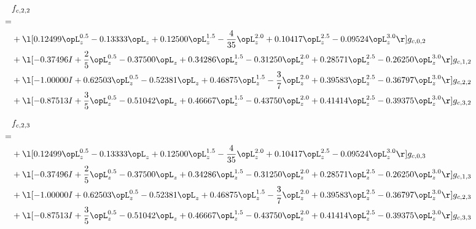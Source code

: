 \begin{alignat}{2} 
\label{eq:f_22_0} 
& f_{c,2,2} \nonumber \\ 
 = \\ 
& + \l[  0.12499 \opL_z^{0.5}   -0.13333 \opL_z +  0.12500 \opL_z^{1.5} - \frac{4}{35} \opL_z^{2.0} +  0.10417 \opL_z^{2.5}   -0.09524 \opL_z^{3.0}  \r] g_{c,0,2} \nonumber \\ 
& + \l[  -0.37496 I + \frac{2}{5} \opL_z^{0.5}   -0.37500 \opL_z +  0.34286 \opL_z^{1.5}   -0.31250 \opL_z^{2.0} +  0.28571 \opL_z^{2.5}   -0.26250 \opL_z^{3.0}  \r] g_{c,1,2} \nonumber \\ 
& + \l[  -1.00000 I +  0.62503 \opL_z^{0.5}   -0.52381 \opL_z +  0.46875 \opL_z^{1.5} - \frac{3}{7} \opL_z^{2.0} +  0.39583 \opL_z^{2.5}   -0.36797 \opL_z^{3.0}  \r] g_{c,2,2} \nonumber \\ 
& + \l[  -0.87513 I + \frac{3}{5} \opL_z^{0.5}   -0.51042 \opL_z +  0.46667 \opL_z^{1.5}   -0.43750 \opL_z^{2.0} +  0.41414 \opL_z^{2.5}   -0.39375 \opL_z^{3.0}  \r] g_{c,3,2} \nonumber \\ 
\end{alignat} 


\begin{alignat}{2} 
\label{eq:f_23_0} 
& f_{c,2,3} \nonumber \\ 
 = \\ 
& + \l[  0.12499 \opL_z^{0.5}   -0.13333 \opL_z +  0.12500 \opL_z^{1.5} - \frac{4}{35} \opL_z^{2.0} +  0.10417 \opL_z^{2.5}   -0.09524 \opL_z^{3.0}  \r] g_{c,0,3} \nonumber \\ 
& + \l[  -0.37496 I + \frac{2}{5} \opL_z^{0.5}   -0.37500 \opL_z +  0.34286 \opL_z^{1.5}   -0.31250 \opL_z^{2.0} +  0.28571 \opL_z^{2.5}   -0.26250 \opL_z^{3.0}  \r] g_{c,1,3} \nonumber \\ 
& + \l[  -1.00000 I +  0.62503 \opL_z^{0.5}   -0.52381 \opL_z +  0.46875 \opL_z^{1.5} - \frac{3}{7} \opL_z^{2.0} +  0.39583 \opL_z^{2.5}   -0.36797 \opL_z^{3.0}  \r] g_{c,2,3} \nonumber \\ 
& + \l[  -0.87513 I + \frac{3}{5} \opL_z^{0.5}   -0.51042 \opL_z +  0.46667 \opL_z^{1.5}   -0.43750 \opL_z^{2.0} +  0.41414 \opL_z^{2.5}   -0.39375 \opL_z^{3.0}  \r] g_{c,3,3} \nonumber \\ 
\end{alignat} 


